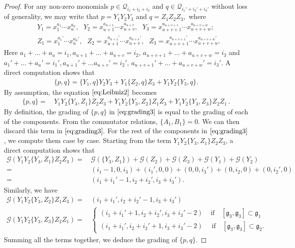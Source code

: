 \documentclass[10pt,a4paper]{amsart}
\begin{document}
 \begin{proof}
     For any non-zero monomials $p  \in \mathcal{Q}_{i_1 + i_2  + i_3}$ and $q \in \mathcal{Q}_{i_1' + i_2' + i_3'}$ without loss of generality, we may write that $p = Y_1Y_2Y_3$ and $q = Z_1Z_2Z_3,$ where  
        \begin{align*}
         &  Y_1 = x_1^{a_1} \cdots x_u^{a_u},    \text{ } Y_2 = x_{u+1}^{a_{u+1}} \cdots x_{u+v}^{a_{u+v}}, \text{ } Y_3 =  x_{u+v+1}^{a_{u+v+1}} \cdots x_{u+v+w}^{a_{u+v+w}} ; \\
      & Z_1 = x_1^{a_1'} \cdots x_u^{a_u'} ,\text{ } Z_2 = x_{u+1}^{a_{u+1}'} \cdots x_{u+v}^{a_{u+v}'} , \text{ }  Z_3 =  x_{u+v+1}^{a_{u+v+1}'} \cdots x_{u+v+w}^{a_{u+v+w}'}.
    \end{align*} 
    Here $a_1 + \ldots + a_u = i_1, a_{u+1} + \ldots + a_{u+v} = i_2$, $a_{u+v+1} + \ldots + a_{u+v+w} = i_3$ and $a_1' + \ldots + a_u' = i_1', a_{u+1}' + \ldots a_{u+v}' = i_2'$, $a_{u+v+1}' + \ldots + a_{u+v+w}' = i_3'.$ A direct computation shows that 
    \begin{align}
     \{p,q\} = \{Y_1,q\}Y_2Y_3 + Y_1\{Z_2,q\}Z_3 + Y_1 Y_2 \{Y_3,q\}. \label{eq:Leibniz2}
 \end{align}    
 By assumption, the equation $\eqref{eq:Leibniz2}$ becomes 
 \begin{align}
     \{p,q\}    =    & \,    Y_1Y_2 \{Y_3,Z_1\}Z_2 Z_3 +  Y_1Y_2 \{Y_3,Z_2\}Z_1 Z_3 +  Y_1Y_2 \{Y_3,Z_3\}Z_2 Z_1 \, . \label{eq:grading3}
 \end{align}   
 By definition, the grading of $\{p,q\}$ in $\eqref{eq:grading3}$ is equal to the grading of each of the components. From the commutator relations, $\{A_1,B_1\} = 0$. We can then discard this term in $\eqref{eq:grading3}.$ For the rest of the components in $\eqref{eq:grading3}$, we  compute them case by case. Starting from the term  $  Y_1Y_2 \{Y_3,Z_1\}Z_2 Z_3$, a direct computation shows that 
 \begin{align*}
     \mathcal{G} \left(  Y_1Y_2 \{Y_3,Z_1\}Z_2 Z_3\right) = & \, \mathcal{G} \left(\{Y_3,Z_1\}\right) + \mathcal{G} (Z_2) + \mathcal{G} (Z_3) + \mathcal{G} (Y_1) +\mathcal{G} (Y_2)  \\
     = & \, (i_1-1,0,i_3) + ( i_1', 0,0 ) + (0,0,i_3')+ (0,i_2,0)+ (0,i_2',0 ) \\
     = & \, (i_1 +i_1'-1,i_2 +i_2',i_3+i_3') .
 \end{align*} Similarly, we have \begin{align*}
      \mathcal{G} \left(Y_1Y_2 \{Y_3,Z_2\}Z_1 Z_3 \right) = & \, (i_1+i_1',i_2+i_2'-1,i_3+i_3')\\
       \mathcal{G} \left(Y_1Y_2 \{Y_3,Z_3\}Z_2 Z_1\right) = & \, \left\{\begin{matrix}
           ( i_1+i_1'+1,i_2+i_2',i_3+i_3'-2) &  \text{ if } \text{ }[\mathfrak{g}_3,\mathfrak{g}_3] \subset \mathfrak{g}_1 \\
           (i_1+i_1',i_2+i_2'+1,i_3+i_3'-2) & \, \text{ if } \text{ }[\mathfrak{g}_3,\mathfrak{g}_3] \subset \mathfrak{g}_2 .
       \end{matrix}\right.   
 \end{align*} 
 Summing all the terms together, we deduce the grading of $\{p,q\}.$  
 \end{proof}
\end{document}
